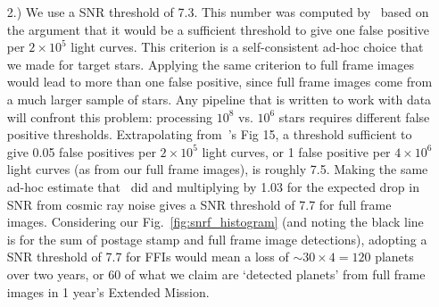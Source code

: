 \begin{itemize}

	    
	    
	\item [2.) We use a SNR threshold of 7.3.] This number was computed by~ based on the argument that it would be a sufficient threshold to give one false positive per $2\times10^5$ light curves.
	This criterion is a self-consistent ad-hoc choice that we made for target stars.
	Applying the same criterion to full frame images would lead to more than one false positive, since full frame images come from a much larger sample of stars.
	Any pipeline that is written to work with \tess data will confront this problem:
	processing $10^8$ vs. $10^6$ stars requires different false positive thresholds.
	Extrapolating from~'s Fig 15, a threshold sufficient to give 0.05 false positives per $2\times10^5$ light curves, or 1 false positive per $4\times10^6$ light curves (as from our full frame images), is roughly 7.5.
	Making the same ad-hoc estimate that~ did and multiplying by 1.03 for the expected drop in SNR from cosmic ray noise gives a SNR threshold of 7.7 for full frame images.
	Considering our Fig.~\ref{fig:snrf_histogram} (and noting the black line is for the sum of postage stamp and full frame image detections), adopting a SNR threshold of 7.7 for FFIs would mean a loss of $\sim30\times4=120$ planets over two years, or 60 of what we claim are `detected planets' from full frame images in 1 year's Extended Mission.	
	

\end{itemize}
